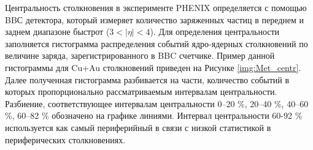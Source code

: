 Центральность столкновения в эксперименте PHENIX определяется с помощью BBС детектора, который измеряет количество заряженных частиц в переднем и заднем диапазоне быстрот ($3<|\eta|<4$). 
Для определения центральности заполняется гистограмма распределения событий ядро-ядерных столкновений по величине заряда, зарегистрированного в BBC счетчике. Пример данной гистограммы для Cu+Au столкновений приведен на Рисунке \ref{img:Met_centr}. Далее полученная гистограмма разбивается на части, количество событий в которых пропорционально рассматриваемым интервалам центральности. Разбиение, соответствующее интервалам центральности 0–20 \%, 20–40 \%, 40–60 \%, 60–82 \% обозначено на графике линиями. Интервал центральности 60-92 \% используется как самый периферийный в связи с низкой статистикой в периферических столкновениях.



